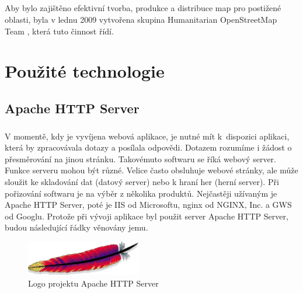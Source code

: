 \documentclass[11pt,a4paper,titlepage,oneside]{book}
\begin{document}
		\paragraph{} Aby bylo zajištěno efektivní tvorba, produkce a distribuce map pro postižené oblasti, byla v lednu 2009 vytvořena skupina Humanitarian OpenStreetMap Team \cite{wiki_hot}, která tuto činnost řídí.
	

\chapter{Použité technologie}
	\section{Apache HTTP Server}


		\paragraph{} V momentě, kdy je vyvíjena webová aplikace, je nutné mít k~dispozici aplikaci, která by zpracovávala dotazy a posílala odpovědi. Dotazem rozumíme i žádost o přesměrování na jinou stránku. Takovémuto softwaru se říká webový server. Funkce serveru mohou být různé. Velice často obsluhuje webové stránky, ale může sloužit ke skladování dat (datový server) nebo k hraní her (herní server). Při pořizování softwaru je na výběr z několika produktů. Nejčastěji užívaným je Apache HTTP Server, poté je IIS od Microsoftu, nginx od NGINX, Inc. a GWS od Googlu. Protože při vývoji aplikace byl použit server Apache HTTP Server, budou následující řádky věnovány jemu.
		\begin{figure}[!h]
			\begin{center}
				\includegraphics[width=5cm]{obrazky/apacheLogo.png}
				\caption{Logo projektu Apache HTTP Server}
			\end{center}
		\end{figure}
\end{document}

